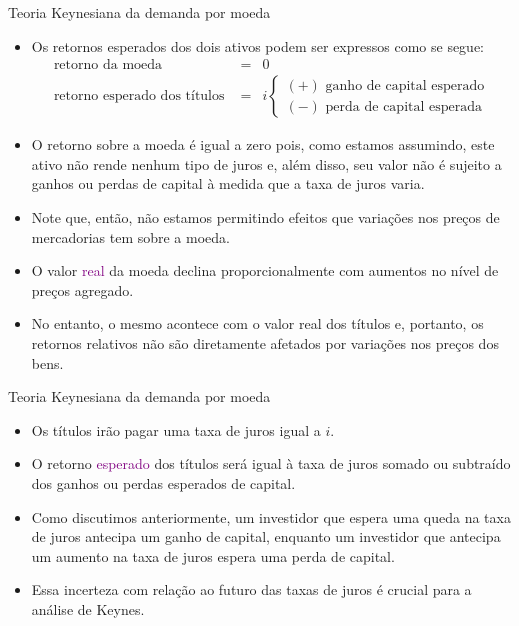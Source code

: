 \documentclass[10pt]{beamer}
\begin{document}
\begin{frame}{Teoria Keynesiana da demanda por moeda}
\begin{itemize}
    \item Os retornos esperados dos dois ativos podem ser expressos como se segue:
    \begin{eqnarray}
    \text{retorno da moeda } &=& 0 \nonumber \\
    \text{retorno esperado dos títulos } &=& i \begin{cases}
    (+) \text{ ganho de capital esperado} \\
    (-) \text{ perda de capital esperada}
    \end{cases} \nonumber
    \end{eqnarray}
    \bigskip
    \item O retorno sobre a moeda é igual a zero pois, como estamos assumindo, este ativo não rende nenhum tipo de juros e, além disso, seu valor não é sujeito a ganhos ou perdas de capital à medida que a taxa de juros varia.
    \bigskip
    \item Note que, então, não estamos permitindo efeitos que variações nos preços de mercadorias tem sobre a moeda.
    \bigskip
    \item O valor \textcolor{purple}{real} da moeda declina proporcionalmente com aumentos no nível de preços agregado.
    \bigskip
    \item No entanto, o mesmo acontece com o valor real dos títulos e, portanto, os retornos relativos não são diretamente afetados por variações nos preços dos bens.
\end{itemize}
\end{frame}

\begin{frame}{Teoria Keynesiana da demanda por moeda}
    \begin{itemize}
        \item Os títulos irão pagar uma taxa de juros igual a $i$.
        \bigskip
        \item O retorno \textcolor{purple}{esperado} dos títulos será igual à taxa de juros somado ou subtraído dos ganhos ou perdas esperados de capital.
        \bigskip
        \item Como discutimos anteriormente, um investidor que espera uma queda na taxa de juros antecipa um ganho de capital, enquanto um investidor que antecipa um aumento na taxa de juros espera uma perda de capital.
        \bigskip
        \item Essa incerteza com relação ao futuro das taxas de juros é crucial para a análise de Keynes.
    \end{itemize}
\end{frame}
\end{document}
